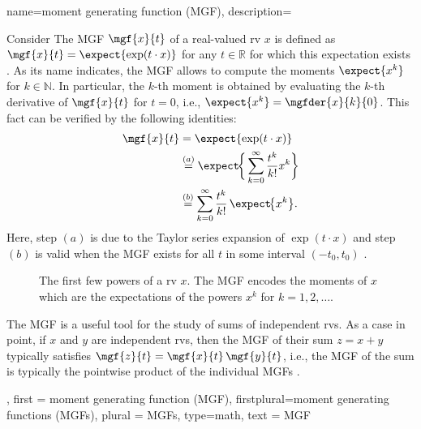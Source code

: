 {name={moment generating function (MGF)}, 
 description={Consider 
     The  MGF $\mgf{x}{t}$ 
	 of a real-valued \gls{rv} $x$ is defined as
	 $\mgf{x}{t} = \expect \{ \exp(t \cdot x) \}$ for any $t \in \mathbb{R}$ 
	 for which this \gls{expectation} exists \cite[Sec. 21]{BillingsleyProbMeasure}. 
	 As its name indicates, the MGF allows to compute the moments 
	 $\expect\{ x^{k} \}$ for $k \in \mathbb{N}$. 
	 In particular, the $k$-th moment is obtained by evaluating the $k$-th 
	 derivative of $\mgf{x}{t}$ for $t=0$, i.e., $\expect\{ x^{k} \} = \mgfder{x}{k}{0}$. 
	 This fact can be verified by the following identities: 
	 \begin{align}
		\mgf{x}{t} & =\expect\{ \exp(t \cdot x)  \} \nonumber \\ 
		& \stackrel{(a)}{=} \expect\!\bigg\{\sum_{k=0}^{\infty} \frac{t^{k}}{k!} x^{k}\bigg\}  \nonumber \\ 
		& \stackrel{(b)}{=}  \sum_{k=0}^{\infty} \frac{t^{k}}{k!}\, \expect\!\big\{ x^{k} \big\}. \nonumber
	 \end{align}
	 Here, step $(a)$ is due to the Taylor series expansion of 
	 $\exp(t \cdot x)$ and step $(b)$ is valid when the MGF exists 
	 for all $t$ in some interval $(-t_{0},t_{0})$ \cite[p. 278]{BillingsleyProbMeasure}.
	 \begin{figure}[ht]
		\centering
		\caption{The first few powers of a \gls{rv} $x$. The MGF 
		encodes the moments of $x$ which are the \glspl{expectation} 
		of the powers $x^{k}$ for $k=1,2,\ldots$.}
		\end{figure}
		The MGF is a useful tool for the study of sums of independent 
		\glspl{rv}. As a case in point, if $x$ and $y$ are independent 
		\glspl{rv}, then the MGF of their sum $z = x + y$ typically 
		satisfies $\mgf{z}{t} = \mgf{x}{t}\,\mgf{y}{t}$,
        i.e., the MGF of the sum is typically the pointwise product of the 
		individual MGFs \cite[p.~280]{BillingsleyProbMeasure}.
 	 }, 
 first = {moment generating function (MGF)}, 
 firstplural={moment generating functions (MGFs)}, 
 plural = {MGFs}, 
 type=math, 
 text = {MGF}
 } 

